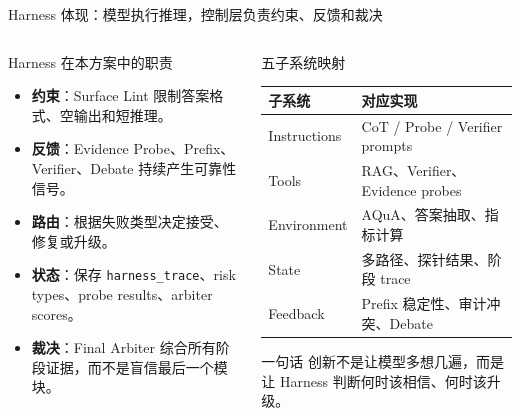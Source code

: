 \documentclass[10pt,aspectratio=169]{beamer}
\newcommand{\tightitems}{\setlength{\itemsep}{0.24em}}
\begin{document}
\begin{frame}{Harness 体现：模型执行推理，控制层负责约束、反馈和裁决}
  \begin{columns}[T,onlytextwidth]
    \begin{column}{0.54\textwidth}
      \begin{block}{Harness 在本方案中的职责}
        \begin{itemize}
          \tightitems
          \item \textbf{约束}：Surface Lint 限制答案格式、空输出和短推理。
          \item \textbf{反馈}：Evidence Probe、Prefix、Verifier、Debate 持续产生可靠性信号。
          \item \textbf{路由}：根据失败类型决定接受、修复或升级。
          \item \textbf{状态}：保存 \texttt{harness\_trace}、risk types、probe results、arbiter scores。
          \item \textbf{裁决}：Final Arbiter 综合所有阶段证据，而不是盲信最后一个模块。
        \end{itemize}
      \end{block}
    \end{column}
    \begin{column}{0.42\textwidth}
      \begin{block}{五子系统映射}
        \small
        \begin{tabularx}{\linewidth}{lY}
          \toprule
          子系统 & 对应实现 \\
          \midrule
          Instructions & CoT / Probe / Verifier prompts \\
          Tools & RAG、Verifier、Evidence probes \\
          Environment & AQuA、答案抽取、指标计算 \\
          State & 多路径、探针结果、阶段 trace \\
          Feedback & Prefix 稳定性、审计冲突、Debate \\
          \bottomrule
        \end{tabularx}
      \end{block}
      \begin{alertblock}{一句话}
        创新不是让模型多想几遍，而是让 Harness 判断何时该相信、何时该升级。
      \end{alertblock}
    \end{column}
  \end{columns}
\end{frame}
\end{document}
